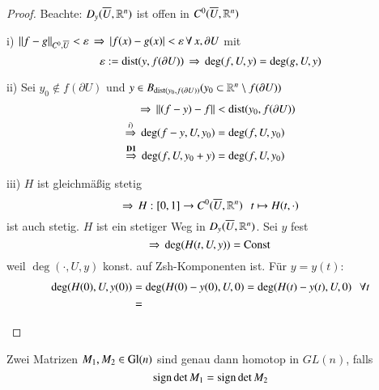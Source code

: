 \begin{proof}
    Beachte: $D_y(\overline U, \mathbb{R}^n)$ ist offen in $C^0(\overline U, \mathbb{R}^n)$
    \begin{description}
    \item{i)}
        $\|f-g\|_{C^0,\overline U} <\varepsilon \, \Rightarrow \, |f(x)-g(x)|<\varepsilon \, \forall \, x,\partial U$ mit
        \[
            \varepsilon:= \mathrm{dist}(y,f(\partial U)) \, \Rightarrow \, \deg (f,U,y)=\deg (g,U,y)
        \]
    \item{ii)}
        Sei $y_0\nin f(\partial U)$ und $y\in B_{\mathrm{dist}(y_0,f(\partial U))}(y_0\subset \mathbb{R}^n\setminus
                f(\partial U))$
        \begin{eqnarray*}
            \Rightarrow \, \|(f-y)-f\|&<\mathrm{dist}(y_0,f(\partial U))\\
                \overset{i)}{\Rightarrow} \, \deg(f-y,U,y_0) &= \deg(f,U,y_0)\\
            \overset{\textbf{D1}}{\Rightarrow } \, \deg (f,U,y_0+y)&= \deg(f,U,y_0)
        \end{eqnarray*}
    \item{iii)}
        $H$ ist gleichmäßig stetig
        \[
            \Rightarrow \, H:[0,1]\rightarrow C^0(\overline U,\mathbb{R}^n)\hspace{.25cm} t\mapsto H(t,\cdot)
        \]
        ist auch stetig. $H$ ist ein stetiger Weg in $D_y(\overline U,\mathbb{R}^n)$. Sei $y$ fest
        \[
            \Rightarrow \, \deg(H(t,U,y))=\mathrm{Const} \,
        \]
        weil $\deg(\cdot,U,y)$ konst. auf Zsh-Komponenten ist. Für $y=y(t):$
        \begin{align*}
            \deg(H(0),U,y(0))&=\deg(H(0)-y(0),U,0)=\deg(H(t)-y(t), U, 0) \hspace{.25cm} \forall t\\
            &=
        \end{align*}
    \end{description}
\end{proof}

\begin{lem}\label{1.3.5}
    Zwei Matrizen $M_1,M_2\in \mathrm{Gl}(n)$ sind genau dann homotop in $GL(n)$, falls
    \[
        \mathrm{sign} \det M_1 = \mathrm{sign}\det M_2
    \]
\end{lem}

